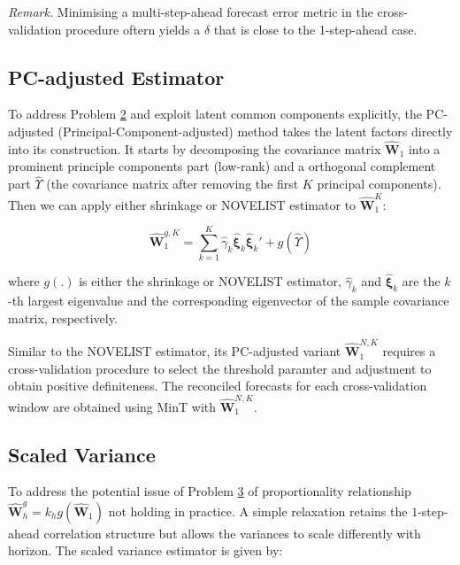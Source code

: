 \documentclass[
  11pt,
  letterpaper,
  DIV=11,
  numbers=noendperiod,
  titlepage]{scrartcl}
\begin{document}
\vspace{-1em}

\emph{Remark.} Minimising a multi-step-ahead forecast error metric in
the cross-validation procedure oftern yields a \(\hat{\delta}\) that is
close to the 1-step-ahead case.

\subsection{PC-adjusted Estimator}\label{pc-adjusted-estimator}

To address Problem \hyperref[prob2]{2} and exploit latent common
components explicitly, the PC-adjusted (Principal-Component-adjusted)
method takes the latent factors directly into its construction. It
starts by decomposing the covariance matrix \(\hat{\boldsymbol{W}}_1\)
into a prominent principle components part (low-rank) and a orthogonal
complement part \(\hat{\Upsilon}\) (the covariance matrix after removing
the first \(K\) principal components). Then we can apply either
shrinkage or NOVELIST estimator to \(\hat{\boldsymbol{W}}^K_{1}\):

\[
\hat{\boldsymbol{W}}^{g, K}_{1} = \sum_{k = 1}^K \hat{\gamma}_k \hat{\boldsymbol{\xi}}_k \hat{\boldsymbol{\xi}}_k' + g(\hat{\Upsilon})
\]

where \(g(.)\) is either the shrinkage or NOVELIST estimator,
\(\hat{\gamma}_k\) and \(\hat{\boldsymbol{\xi}}_k\) are the \(k\)-th
largest eigenvalue and the corresponding eigenvector of the sample
covariance matrix, respectively.

Similar to the NOVELIST estimator, its PC-adjusted variant
\(\hat{\boldsymbol{W}}^{N, K}_{1}\) requires a cross-validation
procedure to select the threshold paramter and adjustment to obtain
positive definiteness. The reconciled forecasts for each
cross-validation window are obtained using MinT with
\(\hat{\boldsymbol{W}}^{N, K}_{1}\).

\subsection{Scaled Variance}\label{scaled-variance}

To address the potential issue of Problem \hyperref[prob3]{3} of
proportionality relationship
\(\hat{\boldsymbol{W}}^g_h = k_h g( \hat{\boldsymbol{W}}_1 )\) not
holding in practice. A simple relaxation retains the \(1\)-step-ahead
correlation structure but allows the variances to scale differently with
horizon. The scaled variance estimator is given by:
\end{document}
